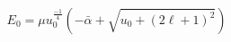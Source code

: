 \begin{equation}                              
E_{0}=\mu u_{0}^{\frac{-1}{4}} (-\bar{\alpha} + \sqrt{u_{0} +(2\ell + 1)^{2}})                              
\end{equation} 
